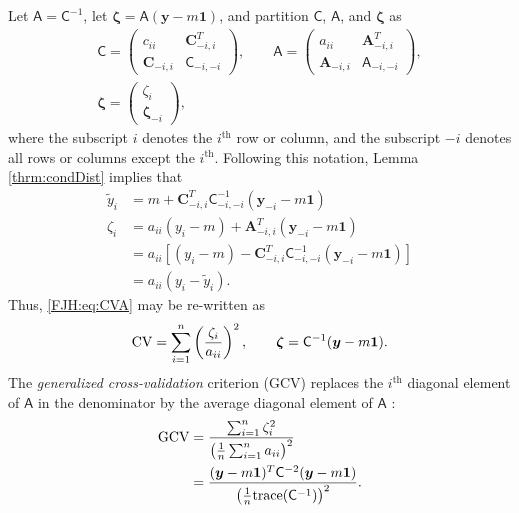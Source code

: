 \documentclass[twocolumn]{svjour3}          %
\newcommand{\bm}[1]{\boldsymbol{#1}}
\newcommand{\trace}[1]{\textup{trace}{#1}}
\newcommand{\vzeta}{{\bm{\zeta}}}
\newcommand{\vA}{\bm{A}}
\newcommand{\vC}{\bm{C}}
\newcommand{\vy}{\bm{y}}
\newcommand{\vone}{\bm{1}}
\newcommand{\mA}{\mathsf{A}}
\newcommand{\mC}{\mathsf{C}}
\begin{document}
Let $\mA = \mC^{-1}$, let $\vzeta = \mA (\vy - m \vone)$, and partition $\mC$, $\mA$, and $\vzeta$ as
\begin{gather*}
\mC = \begin{pmatrix} c_{ii}  & \vC_{-i,i}^T \\  \vC_{-i,i} & \mC_{-i,-i}\end{pmatrix}, \qquad
\mA = \begin{pmatrix} a_{ii}  & \vA_{-i,i}^T \\  \vA_{-i,i} & \mA_{-i,-i}\end{pmatrix}, \\ \vzeta = \begin{pmatrix} \zeta_i   \\  \vzeta_{-i} \end{pmatrix},
\end{gather*}
where the subscript $i$ denotes the $i^{\text{th}}$ row or column, and the subscript $-i$ denotes all rows or columns except the $i^{\text{th}}$. Following this notation, Lemma \ref{thrm:condDist} implies that 
\begin{align*}
\widetilde{y}_i & = m + \vC^T_{-i,i} \mC_{-i,-i}^{-1} (\vy_{-i} -m \vone)  \\
\zeta_i  & = a_{ii}(y_i - m) + \vA_{-i,i}^T(\vy_{-i} - m \vone) \\
& = a_{ii}[(y_i - m) - \vC^T_{-i,i} \mC_{-i,-i}^{-1} (\vy_{-i} -m \vone)] \\
& = a_{ii}(y_i - \widetilde{y}_i).
\end{align*}
Thus, \eqref{FJH:eq:CVA} may be re-written as 
\begin{equation*} %
\textup{CV} = \sum_{i=1}^n \left(\frac{\zeta_i}{a_{ii}} \right)^2, \qquad \vzeta = \mC^{-1}(\vy - m \vone).
\end{equation*}
The \emph{generalized cross-validation} criterion (GCV) replaces the $i^{\text{th}}$ diagonal element of $\mA$ in the denominator by the average diagonal element of $\mA$ \cite{CraWah79a,GolHeaWah79a,Wah90}:
\begin{align*} 
\textup{GCV} &
= \frac{\sum_{i=1}^n\zeta_i^2}{\left(\frac 1n \sum_{i=1}^n a_{ii} \right)^2} \\
& = \frac{(\vy - m\vone)^T \mC^{-2} (\vy - m \vone)}{\left(\frac 1n \trace(\mC^{-1}) \right)^2}.
\end{align*}
\end{document}
